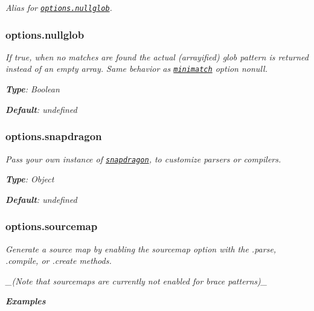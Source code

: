 {\itshape }

{\itshape Alias for \href{#options-nullglob}{\tt options.\+nullglob}.}

{\itshape \subsubsection*{options.\+nullglob}}

{\itshape }

{\itshape If {\ttfamily true}, when no matches are found the actual (arrayified) glob pattern is returned instead of an empty array. Same behavior as \href{https://github.com/isaacs/minimatch}{\tt minimatch} option {\ttfamily nonull}.}

{\itshape {\bfseries Type}\+: {\ttfamily Boolean}}

{\itshape {\bfseries Default}\+: {\ttfamily undefined}}

{\itshape \subsubsection*{options.\+snapdragon}}

{\itshape }

{\itshape Pass your own instance of \href{https://github.com/jonschlinkert/snapdragon}{\tt snapdragon}, to customize parsers or compilers.}

{\itshape {\bfseries Type}\+: {\ttfamily Object}}

{\itshape {\bfseries Default}\+: {\ttfamily undefined}}

{\itshape \subsubsection*{options.\+sourcemap}}

{\itshape }

{\itshape Generate a source map by enabling the {\ttfamily sourcemap} option with the {\ttfamily .parse}, {\ttfamily .compile}, or {\ttfamily .create} methods.}

{\itshape \+\_\+(\+Note that sourcemaps are currently not enabled for brace patterns)\+\_\+}

{\itshape {\bfseries Examples}}

